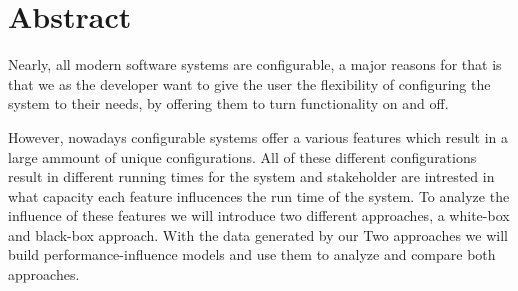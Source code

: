 \begingroup
\let\clearpage\relax
\let\cleardoublepage\relax
\let\cleardoublepage\relax

\chapter*{Abstract}
Nearly, all modern software systems are configurable, a major reasons for that is that we as the developer 
want to give the user the flexibility of configuring the system to their needs, by offering them to turn functionality on and off. 

However, nowadays configurable systems offer a various features which result in a large ammount of unique configurations. All of these different
configurations result in different running times for the system and stakeholder are intrested in what capacity each feature influcences
the run time of the system. To analyze the influence of these features we will introduce two different approaches, a white-box and black-box
approach. With the data generated by our Two approaches we will build performance-influence models and use them to analyze and compare both
approaches. 




\vfill

\endgroup

\vfill
